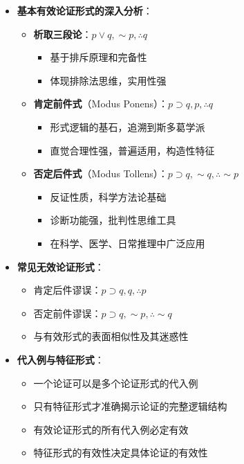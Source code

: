 \begin{center}
{{\begin{itemize}
\begin{itemize}
  \end{itemize}
\item \textbf{基本有效论证形式的深入分析}：
  \begin{itemize}
  \item \textbf{析取三段论}：$p \vee q, \sim p, \therefore q$
    \begin{itemize}
    \item 基于排斥原理和完备性
    \item 体现排除法思维，实用性强
    \end{itemize}
  \item \textbf{肯定前件式}（Modus Ponens）：$p \supset q, p, \therefore q$
    \begin{itemize}
    \item 形式逻辑的基石，追溯到斯多葛学派
    \item 直觉合理性强，普遍适用，构造性特征
    \end{itemize}
  \item \textbf{否定后件式}（Modus Tollens）：$p \supset q, \sim q, \therefore \sim p$
    \begin{itemize}
    \item 反证性质，科学方法论基础
    \item 诊断功能强，批判性思维工具
    \item 在科学、医学、日常推理中广泛应用
    \end{itemize}
  \end{itemize}
\item \textbf{常见无效论证形式}：
  \begin{itemize}
  \item 肯定后件谬误：$p \supset q, q, \therefore p$
  \item 否定前件谬误：$p \supset q, \sim p, \therefore \sim q$
  \item 与有效形式的表面相似性及其迷惑性
  \end{itemize}
\item \textbf{代入例与特征形式}：
  \begin{itemize}
  \item 一个论证可以是多个论证形式的代入例
  \item 只有特征形式才准确揭示论证的完整逻辑结构
  \item 有效论证形式的所有代入例必定有效
  \item 特征形式的有效性决定具体论证的有效性
  \end{itemize}
\end{itemize}
}}
\end{center}